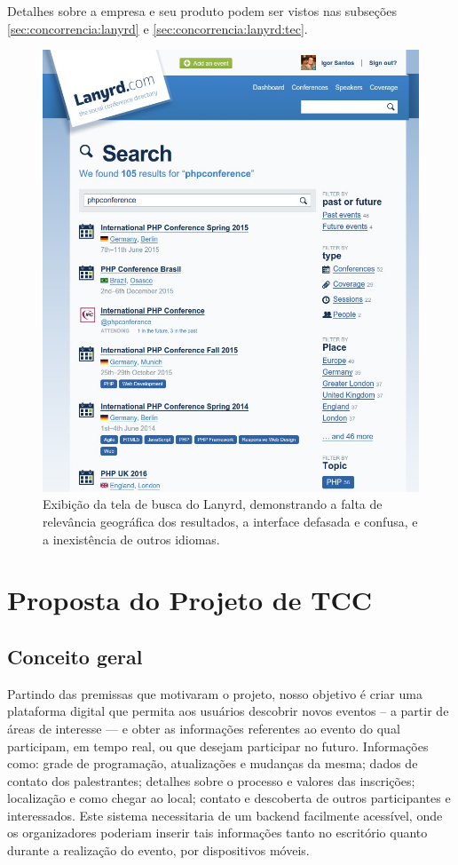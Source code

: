 \documentclass[12pt,a4paper,twoside,hyphens,english,brazil]{abntex2}
\begin{document}
Detalhes sobre a empresa e seu produto podem ser vistos nas subseções \ref{sec:concorrencia:lanyrd} e \ref{sec:concorrencia:lanyrd:tec}.


\begin{figure}[hb]
	\centering
	\includegraphics[width=1\linewidth]{imagens/lanyrd}
	\caption[Demonstração da interface do Lanyrd]{Exibição da tela de busca do Lanyrd, demonstrando a falta de relevância geográfica dos resultados, a interface defasada e confusa, e a inexistência de outros idiomas.}
	\label{fig:lanyrd}
\end{figure}

\chapter{Proposta do Projeto de TCC}

\section{Conceito geral}
Partindo das premissas que motivaram o projeto, nosso objetivo é criar uma plataforma digital que permita aos usuários descobrir novos eventos -- a partir de áreas de interesse --- e obter as informações referentes ao evento do qual participam, em tempo real, ou que desejam participar no futuro. Informações como: grade de programação, atualizações e mudanças da mesma; dados de contato dos palestrantes; detalhes sobre o processo e valores das inscrições; localização e como chegar ao local; contato e descoberta de outros participantes e interessados. Este sistema necessitaria de um backend facilmente acessível, onde os organizadores poderiam inserir tais informações tanto no escritório quanto durante a realização do evento, por dispositivos móveis.
\end{document}
